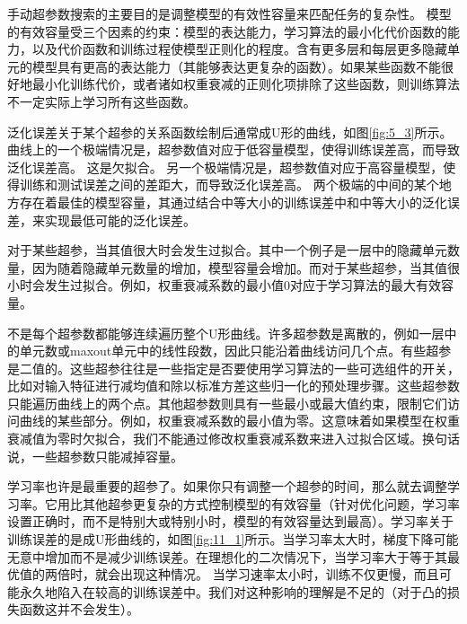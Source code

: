 手动超参数搜索的主要目的是调整模型的有效性容量来匹配任务的复杂性。 模型的有效容量受三个因素的约束：模型的表达能力，学习算法的最小化代价函数的能力，以及代价函数和训练过程使模型正则化的程度。含有更多层和每层更多隐藏单元的模型具有更高的表达能力（其能够表达更复杂的函数）。如果某些函数不能很好地最小化训练代价，或者诸如权重衰减的正则化项排除了这些函数，则训练算法不一定实际上学习所有这些函数。

泛化误差关于某个超参的关系函数绘制后通常成U形的曲线，如图\ref{fig:5_3}所示。曲线上的一个极端情况是，超参数值对应于低容量模型，使得训练误差高，而导致泛化误差高。 这是欠拟合。 另一个极端情况是，超参数值对应于高容量模型，使得训练和测试误差之间的差距大，而导致泛化误差高。 两个极端的中间的某个地方存在着最佳的模型容量，其通过结合中等大小的训练误差中和中等大小的泛化误差，来实现最低可能的泛化误差。

对于某些超参，当其值很大时会发生过拟合。其中一个例子是一层中的隐藏单元数量，因为随着隐藏单元数量的增加，模型容量会增加。而对于某些超参，当其值很小时会发生过拟合。例如，权重衰减系数的最小值0对应于学习算法的最大有效容量。

不是每个超参数都能够连续遍历整个U形曲线。许多超参数是离散的，例如一层中的单元数或maxout单元中的线性段数，因此只能沿着曲线访问几个点。有些超参是二值的。这些超参往往是一些指定是否要使用学习算法的一些可选组件的开关，比如对输入特征进行减均值和除以标准方差这些归一化的预处理步骤。这些超参数只能遍历曲线上的两个点。其他超参数则具有一些最小或最大值约束，限制它们访问曲线的某些部分。例如，权重衰减系数的最小值为零。这意味着如果模型在权重衰减值为零时欠拟合，我们不能通过修改权重衰减系数来进入过拟合区域。换句话说，一些超参数只能减掉容量。

学习率也许是最重要的超参了。如果你只有调整一个超参的时间，那么就去调整学习率。它用比其他超参更复杂的方式控制模型的有效容量（针对优化问题，学习率设置正确时，而不是特别大或特别小时，模型的有效容量达到最高）。学习率关于训练误差的是成U形曲线的，如图\ref{fig:11_1}所示。当学习率太大时，梯度下降可能无意中增加而不是减少训练误差。在理想化的二次情况下，当学习率大于等于其最优值的两倍时，就会出现这种情况。 当学习速率太小时，训练不仅更慢，而且可能永久地陷入在较高的训练误差中。我们对这种影响的理解是不足的（对于凸的损失函数这并不会发生）。

